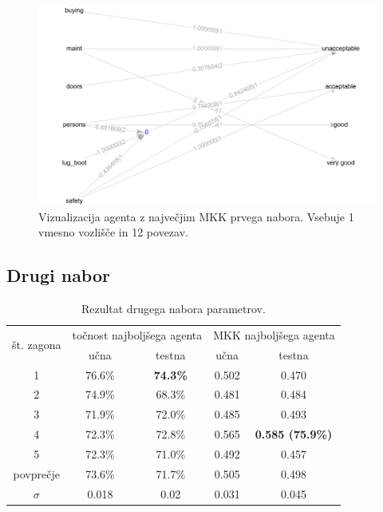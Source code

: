 \begin{figure}[H]
    \begin{center}
        \includegraphics[width=13cm]{car/1/mcc_g}
    \end{center}
    \caption{Vizualizacija agenta z največjim MKK prvega nabora. Vsebuje 1 vmesno vozlišče in 12 povezav.}
    \label{fig:car_mcc_1_g}
\end{figure}

\subsection{Drugi nabor}\label{subsec:dodatek-car-drugi-nabor}
\begin{table}[H]
    \begin{center}
        \begin{tabular}{|| c | c c || c c ||}
            \hline
            \multirow{2}{*}{št. zagona} & \multicolumn{2}{c||}{točnost najboljšega agenta} & \multicolumn{2}{c||}{MKK najboljšega agenta} \\ \cline{2-5}
            & učna   & testna          & učna  & testna                  \\
            \hline
            1         & 76.6\% & \textbf{74.3\%} & 0.502 & 0.470                   \\
            \hline
            2         & 74.9\% & 68.3\%          & 0.481 & 0.484                   \\
            \hline
            3         & 71.9\% & 72.0\%          & 0.485 & 0.493                   \\
            \hline
            4         & 72.3\% & 72.8\%          & 0.565 & \textbf{0.585 (75.9\%)} \\
            \hline
            5         & 72.3\% & 71.0\%          & 0.492 & 0.457                   \\
            \hline
            povprečje & 73.6\% & 71.7\%          & 0.505 & 0.498                   \\
            \hline
            $\sigma$  & 0.018  & 0.02            & 0.031 & 0.045                   \\
            \hline
        \end{tabular}
    \end{center}
    \caption{Rezultat drugega nabora parametrov.}
    \label{tab:car_result_2}
\end{table}

